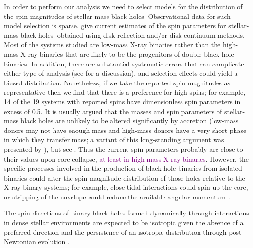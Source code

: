 \documentclass[modern,linenumbers]{aastex61}
\newcommand{\ilya}[1]{\textcolor{purple}{#1}}
\begin{document}
In order to perform our analysis we need to select models for the
distribution of the spin magnitudes of stellar-mass black holes.
Observational data for such model selection is sparse.
\citet{2015PhR...548....1M} give current estimates of the spin
parameters for stellar-mass black holes, obtained using disk
reflection and/or disk continuum methods.  Most of the systems studied
are low-mass X-ray binaries rather than the high-mass X-ray binaries
that are likely to be the progenitors of double black hole binaries.
In addition, there are substantial systematic errors that can
complicate either type of analysis (see \citealt{2015PhR...548....1M}
for a discussion), and selection effects could yield a biased
distribution. Nonetheless, if we take the reported spin magnitudes as
representative then we find that there is a preference for high spins;
for example, 14 of the 19 systems with reported spins have
dimensionless spin parameters in excess of 0.5.  It is usually argued
that the masses and spin parameters of stellar-mass black holes are
unlikely to be altered significantly by accretion (low-mass donors may
not have enough mass and high-mass donors have a very short phase in
which they transfer mass; a variant of this long-standing argument was
presented by \citet{1999MNRAS.305..654K}), but see
\citet{2003MNRAS.341..385P,2015ApJ...800...17F}.  Thus the current
spin parameters probably are close to their values upon core collapse, \ilya{at least in high-mass X-ray binaries}.
However, the specific processes involved in the production of black
hole binaries from isolated binaries could alter the spin magnitude
distribution of those holes relative to the X-ray binary systems; for
example, close tidal interactions could spin up the core, or stripping
of the envelope could reduce the available angular momentum
\citep{2016MNRAS.462..844K,2017arXiv170200885Z,2017arXiv170203952H}.

The spin directions of binary black holes formed dynamically through
interactions in dense stellar environments
\citep{SigurdssonHernquist:1993,1993Natur.364..421K,PZMcMillan:2000,Rodriguez:2015,Stone:2016}
are expected to be isotropic given the absence of a preferred
direction \citep[e.g.,][]{2016ApJ...832L...2R} and the persistence of
an isotropic distribution through post-Newtonian evolution
\citep{2004PhRvD..70l4020S,2007ApJ...661L.147B}.
\end{document}
